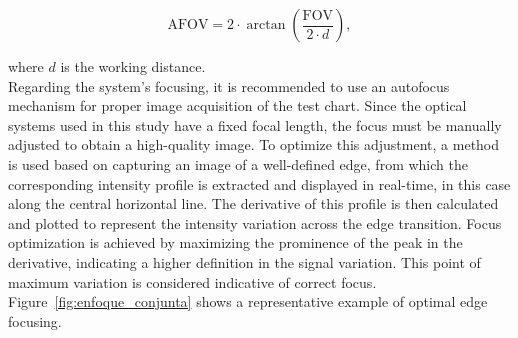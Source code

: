 \begin{equation}
\text{AFOV} = 2 \cdot \arctan\left(\frac{\text{FOV}}{2 \cdot d}\right),
\label{eq:fov_angular}
\end{equation}

where \( d \) is the working distance.\\

Regarding the system's focusing, it is recommended to use an autofocus mechanism for proper image acquisition of the test chart. Since the optical systems used in this study have a fixed focal length, the focus must be manually adjusted to obtain a high-quality image. To optimize this adjustment, a method is used based on capturing an image of a well-defined edge, from which the corresponding intensity profile is extracted and displayed in real-time, in this case along the central horizontal line. The derivative of this profile is then calculated and plotted to represent the intensity variation across the edge transition. Focus optimization is achieved by maximizing the prominence of the peak in the derivative, indicating a higher definition in the signal variation. This point of maximum variation is considered indicative of correct focus. Figure~\ref{fig:enfoque_conjunta} shows a representative example of optimal edge focusing.

